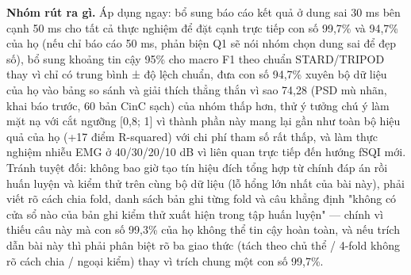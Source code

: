 \documentclass[12pt,a4paper]{article}
\begin{document}
\noindent \textbf{\color{tdtblue}Nhóm rút ra gì.} Áp dụng ngay: bổ sung báo cáo kết quả ở dung sai 30 ms bên cạnh 50 ms cho tất cả thực nghiệm để đặt cạnh trực tiếp con số 99,7\% và 94,7\% của họ (nếu chỉ báo cáo 50 ms, phản biện Q1 sẽ nói nhóm chọn dung sai để đẹp số), bổ sung khoảng tin cậy 95\% cho macro F1 theo chuẩn STARD/TRIPOD thay vì chỉ có trung bình ± độ lệch chuẩn, đưa con số 94,7\% xuyên bộ dữ liệu của họ vào bảng so sánh và giải thích thẳng thắn vì sao 74,28 (PSD mù nhãn, khai báo trước, 60 bản CinC sạch) của nhóm thấp hơn, thử ý tưởng chú ý làm mặt nạ với cắt ngưỡng [0,8; 1] vì thành phần này mang lại gần như toàn bộ hiệu quả của họ (+17 điểm R-squared) với chi phí tham số rất thấp, và làm thực nghiệm nhiễu EMG ở 40/30/20/10 dB vì liên quan trực tiếp đến hướng fSQI mới. Tránh tuyệt đối: không bao giờ tạo tín hiệu đích tổng hợp từ chính đáp án rồi huấn luyện và kiểm thử trên cùng bộ dữ liệu (lỗ hổng lớn nhất của bài này), phải viết rõ cách chia fold, danh sách bản ghi từng fold và câu khẳng định "không có cửa sổ nào của bản ghi kiểm thử xuất hiện trong tập huấn luyện" — chính vì thiếu câu này mà con số 99,3\% của họ không thể tin cậy hoàn toàn, và nếu trích dẫn bài này thì phải phân biệt rõ ba giao thức (tách theo chủ thể / 4-fold không rõ cách chia / ngoại kiểm) thay vì trích chung một con số 99,7\%.\par\vspace{3pt}
\vspace{6pt}
\end{document}
